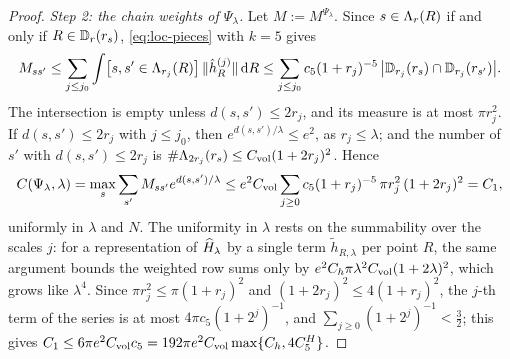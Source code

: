 \begin{proof}
\emph{Step 2: the chain weights of $\Psi_\lambda$.} Let $M:=M^{\Psi_\lambda}$. Since $s\in\Lambda_{r}(R)$ if and only if
$R\in\mathbb D_r(r_{s})$, \eqref{eq:loc-pieces} with $k=5$ gives
\[
M_{ss'}\le\sum_{j\le j_0}\int\bigl[s,s'\in\Lambda_{r_j}(R)\bigr]\,\lVert\hat h^{(j)}_R\rVert\,\mathrm{d} R\le
\sum_{j\le j_0}c_5(1+r_j)^{-5}\,\bigl\lvert\mathbb D_{r_j}(r_{s})\cap\mathbb D_{r_j}(r_{s'})\bigr\rvert .
\]
The intersection is empty unless $d(s,s')\le2r_j$, and its measure is at most $\pi r_j^2$. If $d(s,s')\le2r_j$ with
$j\le j_0$, then $e^{d(s,s')/\lambda}\le e^2$, as $r_j\le\lambda$; and the number of $s'$ with $d(s,s')\le2r_j$ is
$\#\Lambda_{2r_j}(r_{s})\le C_{\mathrm{vol}}(1+2r_j)^2$. Hence
\begin{equation}\label{eq:loc-C1}
C(\Psi_\lambda,\lambda)=\max_s\sum_{s'}M_{ss'}e^{d(s,s')/\lambda}\le e^2C_{\mathrm{vol}}\sum_{j\ge0}c_5(1+r_j)^{-5}\,\pi r_j^2\,(1+2r_j)^2=C_1,
\end{equation}
uniformly in $\lambda$ and $N$. The uniformity in $\lambda$ rests on the summability over the scales $j$: for a
representation of $\widehat{H}_\lambda$ by a single term $\tilde h_{R,\lambda}$ per point $R$, the same argument bounds the weighted
row sums only by $e^2C_h\pi\lambda^2C_{\mathrm{vol}}(1+2\lambda)^2$, which grows like $\lambda^4$. Since $\pi r_j^2\le\pi(1+r_j)^2$ and
$(1+2r_j)^2\le4(1+r_j)^2$, the $j$-th term of the series
is at most $4\pi c_5(1+2^j)^{-1}$, and $\sum_{j\ge0}(1+2^j)^{-1}<\frac32$; this gives
$C_1\le6\pi e^2C_{\mathrm{vol}} c_5=192\pi e^2C_{\mathrm{vol}}\max\{C_h,4C^H_5\}$.


\end{proof}
